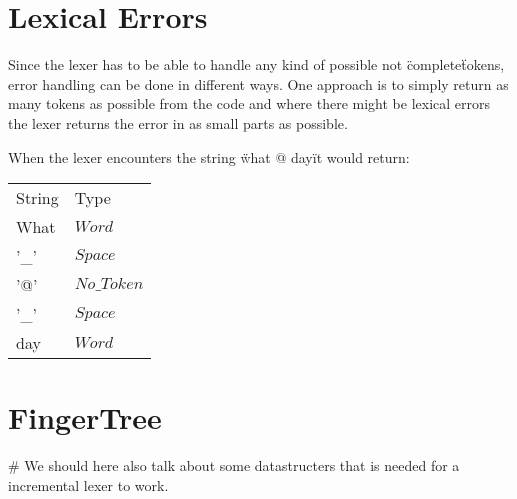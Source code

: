 \section{Lexical Errors}
Since the lexer has to be able to handle any kind of possible not \"complete\"
tokens, error handling can be done in different ways. One approach is to simply
return as many tokens as possible from the code and where there might be lexical
errors the lexer returns the error in as small parts as possible.
\begin{example} When the lexer encounters the
string \"what @ day\" it would return:
\begin{center}
\begin{tabular}{ll}
String & Type\\
What & $Word$\\
'\_' & $Space$\\
'@' & $No\_Token$\\
'\_' & $Space$\\
day & $Word$\\
\end{tabular}
\end{center}
\end{example}
\section{FingerTree}
\# We should here also talk about some datastructers that is needed for a
incremental lexer to work.
